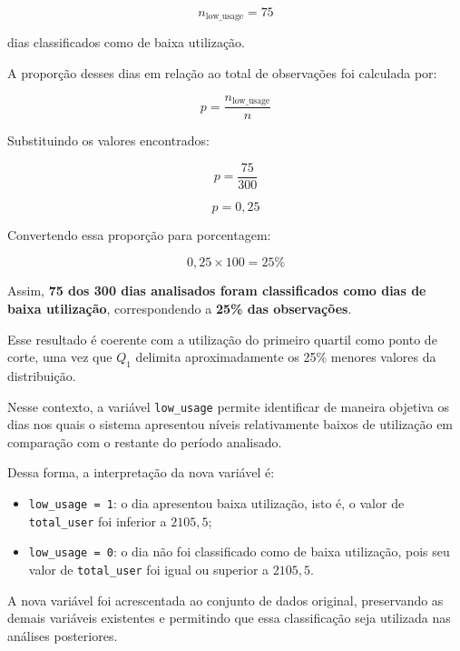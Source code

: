 \documentclass[12pt,a4paper]{article}
\begin{document}
\[
n_{\text{low\_usage}} = 75
\]

dias classificados como de baixa utilização.

A proporção desses dias em relação ao total de observações foi calculada por:

\[
p =
\frac{n_{\text{low\_usage}}}{n}
\]

Substituindo os valores encontrados:

\[
p =
\frac{75}{300}
\]

\[
p = 0{,}25
\]

Convertendo essa proporção para porcentagem:

\[
0{,}25 \times 100 = 25\%
\]

Assim, \textbf{75 dos 300 dias analisados foram classificados como dias de baixa utilização}, correspondendo a \textbf{25\% das observações}.

Esse resultado é coerente com a utilização do primeiro quartil como ponto de corte, uma vez que $Q_1$ delimita aproximadamente os 25\% menores valores da distribuição.

Nesse contexto, a variável \texttt{low\_usage} permite identificar de maneira objetiva os dias nos quais o sistema apresentou níveis relativamente baixos de utilização em comparação com o restante do período analisado.

Dessa forma, a interpretação da nova variável é:

\begin{itemize}
    \item \texttt{low\_usage = 1}: o dia apresentou baixa utilização, isto é, o valor de \texttt{total\_user} foi inferior a $2105{,}5$;
    
    \item \texttt{low\_usage = 0}: o dia não foi classificado como de baixa utilização, pois seu valor de \texttt{total\_user} foi igual ou superior a $2105{,}5$.
\end{itemize}

A nova variável foi acrescentada ao conjunto de dados original, preservando as demais variáveis existentes e permitindo que essa classificação seja utilizada nas análises posteriores.
\end{document}
